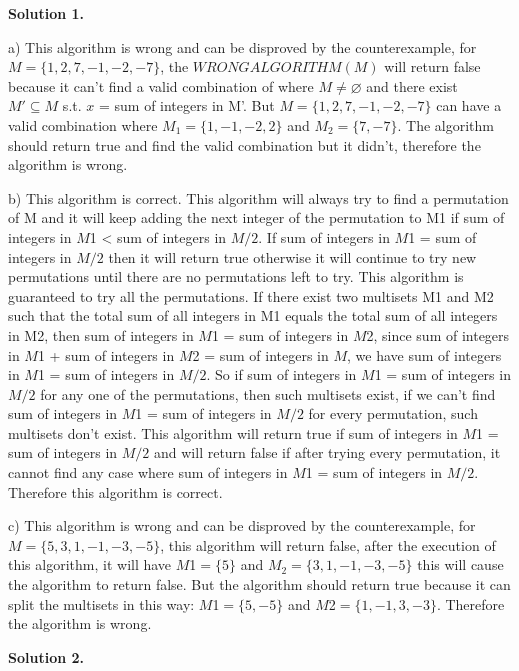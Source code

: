 \documentclass[12pt]{article}
\newcommand{\solution}[1]{\noindent \textbf{Solution #1.}}
\begin{document}
\solution{1} 

a) 
This algorithm is wrong and can be disproved by the counterexample, for $M = \{1,2,7,-1,-2,-7\}$, the $WRONGALGORITHM(M)$ will return false because it can't find a valid combination of where $M \neq \varnothing $ and there exist $ M' \subseteq M $ s.t. $x$ = sum of integers in M'. But  $M = \{1,2,7,-1,-2,-7\}$ can have a valid combination where  $M_1 = \{1,-1,-2,2\}$ and  $M_2 = \{7,-7\}$. The algorithm should return true and find the valid combination but it didn't, therefore the algorithm is wrong.

b)
This algorithm is correct. This algorithm will always try to find a permutation of M  and it will keep adding the next integer of the permutation to M1 if sum of integers in $M$1 < sum of integers in $M/2$. If sum of integers in $M$1 = sum of integers in $M/2$ then it will return true otherwise it will continue to try new permutations until there are no permutations left to try.  This algorithm is guaranteed to try all the permutations. If there exist two multisets
M1 and M2 such that the total sum of all integers in M1 equals the total sum of
all integers in M2, then sum of integers in $M$1 = sum of integers in $M$2, since sum of integers in $M$1 + sum of integers in $M$2 = sum of integers in $M$, we have sum of integers in $M$1 = sum of integers in $M/2$. So if sum of integers in $M$1 = sum of integers in $M/2$ for any one of the permutations, then such multisets exist, if we can't find sum of integers in $M$1 = sum of integers in $M/2$ for every permutation, such multisets don't exist. This algorithm will return true if sum of integers in $M$1 = sum of integers in $ M/2$ and will return false if after trying every permutation, it cannot find any case where sum of integers in $M$1 = sum of integers in $M/2$.  Therefore this algorithm is correct.

c)
This algorithm is wrong and can be disproved by the counterexample,  for $M = \{5,3,1,-1,-3,-5\}$, this algorithm will return false, after the execution of this algorithm, it will have $M$1$ = \{5\}$ and  $M_2 = \{3,1,-1,-3,-5\}$ this will cause the algorithm to return false. But the algorithm should return true because it can split the  multisets in this way:
 $M$1$ = \{5,-5\}$ and $M$2$ = \{1,-1,3,-3\}$. Therefore the algorithm is wrong.

\solution{2} 
\end{document}

